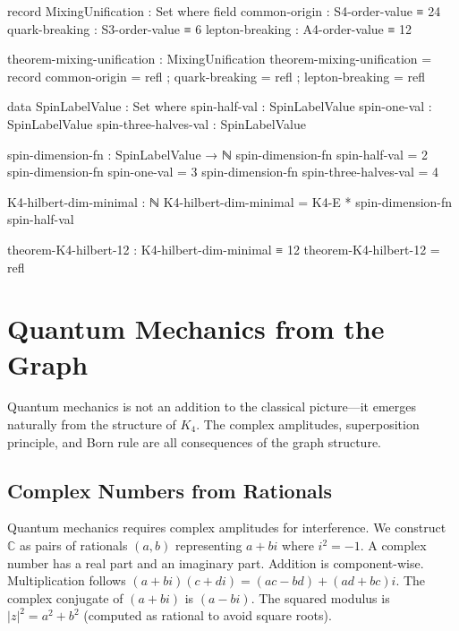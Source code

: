 \documentclass[11pt,a4paper]{book}
\begin{document}
\begin{code}
record MixingUnification : Set where
  field
    common-origin    : S4-order-value ≡ 24
    quark-breaking   : S3-order-value ≡ 6
    lepton-breaking  : A4-order-value ≡ 12

theorem-mixing-unification : MixingUnification
theorem-mixing-unification = record
  { common-origin   = refl
  ; quark-breaking  = refl
  ; lepton-breaking = refl
  }
\end{code}

\begin{code}
data SpinLabelValue : Set where
  spin-half-val : SpinLabelValue
  spin-one-val : SpinLabelValue
  spin-three-halves-val : SpinLabelValue

spin-dimension-fn : SpinLabelValue → ℕ
spin-dimension-fn spin-half-val = 2
spin-dimension-fn spin-one-val = 3
spin-dimension-fn spin-three-halves-val = 4

K4-hilbert-dim-minimal : ℕ
K4-hilbert-dim-minimal = K4-E * spin-dimension-fn spin-half-val

theorem-K4-hilbert-12 : K4-hilbert-dim-minimal ≡ 12
theorem-K4-hilbert-12 = refl
\end{code}

\chapter{Quantum Mechanics from the Graph}
\label{chap:quantum-mechanics}

Quantum mechanics is not an addition to the classical picture—it emerges naturally from the structure of $K_4$. The complex amplitudes, superposition principle, and Born rule are all consequences of the graph structure.

\section{Complex Numbers from Rationals}

Quantum mechanics requires complex amplitudes for interference. We construct
$\mathbb{C}$ as pairs of rationals $(a, b)$ representing $a + bi$ where $i^2 = -1$.
A complex number has a real part and an imaginary part. Addition is component-wise. Multiplication follows $(a+bi)(c+di) = (ac-bd) + (ad+bc)i$. The complex conjugate of $(a+bi)$ is $(a-bi)$. The squared modulus is $|z|^2 = a^2 + b^2$ (computed as rational to avoid square roots).
\end{document}
